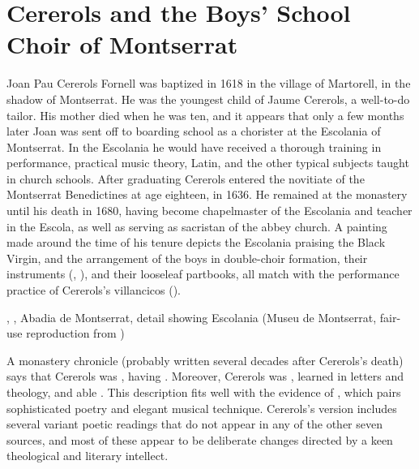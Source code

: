
\section{Cererols and the Boys' School Choir of Montserrat}

Joan Pau Cererols Fornell was baptized in 1618 in the village of Martorell, in
the shadow of Montserrat.%
    \Autocite{Balanza:CererolsFamily}
He was the youngest child of Jaume Cererols, a well-to-do tailor.
His mother died when he was ten, and it appears that only a few months later
Joan was sent off to boarding school as a chorister at the Escolania of
Montserrat.
In the Escolania he would have received a thorough training in performance,
practical music theory, Latin, and the other typical subjects taught in church
schools.
After graduating Cererols entered the novitiate of the Montserrat Benedictines
at age eighteen, in 1636.
He remained at the monastery until his death in 1680, having become chapelmaster
of the Escolania and teacher in the Escola, as well as serving as sacristan of
the abbey church.
A painting made around the time of his tenure depicts the Escolania praising
the Black Virgin, and the arrangement of the boys in double-choir formation,
their instruments (, ), and their looseleaf
partbooks, all match with the performance practice of Cererols's villancicos
().%
    \Autocite[34]{Laplana:MontserratMuseu}


{, , Abadia de Montserrat, detail
showing Escolania (Museu de Montserrat, fair-use reproduction from
)}

A monastery chronicle (probably written several decades after Cererols's death)
says that Cererols was , having .%
    \Autocite[7, note 2]{Estrada:CererolsBio}
Moreover, Cererols was , learned in letters and
theology, and able .%
    \Autocite[7, note 2]{Estrada:CererolsBio}
This description fits well with the evidence of ,
which pairs sophisticated poetry and elegant musical technique.
Cererols's version includes several variant poetic readings that do not appear
in any of the other seven sources, and most of these appear to be deliberate
changes directed by a keen theological and literary intellect.

